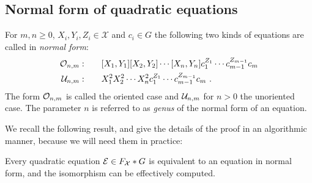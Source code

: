 \documentclass[a4paper,11pt]{amsart}
\begin{document}
\subsection{Normal form of quadratic equations} \label{sec:normal_form}
\begin{defi}
  For $m,n\ge0$, $X_i,Y_i,Z_i \in\mathcal{X}$ and $c_i \in G$ the following two kinds of
  equations are called in \emph{normal form}:
 \begin{align}
  \mathcal{O}_{n,m}:\qquad & [X_1,Y_1][X_2,Y_2]\cdots[X_n,Y_n]c_1^{Z_1}\cdots c_{m-1}^{Z_{m-1}}c_m  \\
   \mathcal{U}_{n,m}:\qquad & X_1^2X_2^2\cdots X_n^2 c_1^{Z_1}\cdots c_{m-1}^{Z_{m-1}}c_m\ .
 \end{align} 
 The form $\mathcal{O}_{n,m}$ is called the oriented case and $\mathcal{U}_{n,m}$ for
 $n>0$ the unoriented case.  The parameter $n$ is referred to as
 \emph{genus} of the normal form of an equation.
\end{defi}

We recall the following result, and give the details of the proof in
an algorithmic manner, because we will need them in practice:
\begin{thm} \label{Thm:equationNormalForm}
  Every quadratic equation $\mathcal{E} \in F_{\mathcal{X}}*G$ is equivalent to an equation
  in normal form, and the isomorphism can be effectively computed.
\end{thm}
\end{document}
